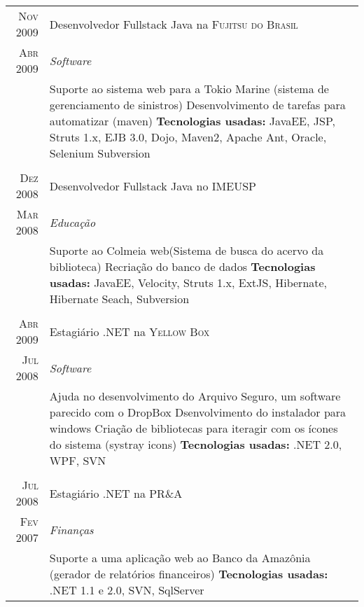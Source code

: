 \documentclass[a4paper,10pt]{article}
\begin{document}
\begin{tabular}{r|p{11cm}}
\textsc{Nov 2009} & Desenvolvedor Fullstack Java na \textsc{Fujitsu do Brasil}\\
\textsc{Abr 2009}&\emph{Software}\\&\footnotesize{  Suporte ao sistema web para a Tokio Marine (sistema de gerenciamento de sinistros)\newline
                          Desenvolvimento de tarefas para automatizar (maven)\newline
\textbf{Tecnologias usadas:} JavaEE, JSP, Struts 1.x, EJB 3.0, Dojo, Maven2, Apache Ant, Oracle, Selenium Subversion
 }\\\multicolumn{2}{c}{} \\ 
 \textsc{Dez 2008} & Desenvolvedor Fullstack Java no \textsc{IMEUSP} \\\textsc{Mar 2008} &\emph{Educação}\\&\footnotesize{ Suporte ao Colmeia web(Sistema de busca do acervo da biblioteca)\newline
                          Recriação do banco de dados\newline
\textbf{Tecnologias usadas:} JavaEE, Velocity, Struts 1.x, ExtJS, Hibernate, Hibernate Seach, Subversion
 }\\\multicolumn{2}{c}{} \\
 
\textsc{Abr 2009} & Estagiário .NET na \textsc{Yellow Box}\\
\textsc{Jul 2008}&\emph{Software}\\&\footnotesize{ Ajuda no desenvolvimento do Arquivo Seguro, um software parecido com o DropBox\newline
   Dsenvolvimento do instalador para windows\newline
   Criação de bibliotecas para iteragir com os ícones do sistema (systray icons)\newline
\textbf{Tecnologias usadas:} .NET 2.0, WPF, SVN
 }\\\multicolumn{2}{c}{} \\
 \textsc{Jul 2008} & Estagiário .NET na \textsc{PR\&A} \\\textsc{Fev 2007}&\emph{Finanças}\\&\footnotesize{  Suporte a uma aplicação web ao Banco da Amazônia (gerador de relatórios financeiros) \newline
\textbf{Tecnologias usadas:} .NET 1.1 e 2.0, SVN, SqlServer
 }
\end{tabular}



\end{document}
